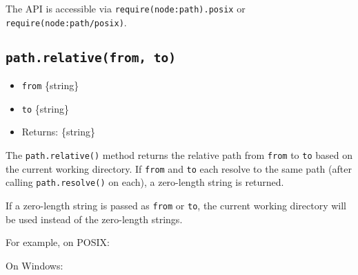 The API is accessible via
\texttt{require(\textquotesingle{}node:path\textquotesingle{}).posix} or
\texttt{require(\textquotesingle{}node:path/posix\textquotesingle{})}.

\subsection{\texorpdfstring{\texttt{path.relative(from,\ to)}}{path.relative(from, to)}}\label{path.relativefrom-to}

\begin{itemize}
\tightlist
\item
  \texttt{from} \{string\}
\item
  \texttt{to} \{string\}
\item
  Returns: \{string\}
\end{itemize}

The \texttt{path.relative()} method returns the relative path from
\texttt{from} to \texttt{to} based on the current working directory. If
\texttt{from} and \texttt{to} each resolve to the same path (after
calling \texttt{path.resolve()} on each), a zero-length string is
returned.

If a zero-length string is passed as \texttt{from} or \texttt{to}, the
current working directory will be used instead of the zero-length
strings.

For example, on POSIX:

\begin{Shaded}
\begin{Highlighting}[]
\NormalTok{(}\OperatorTok{,} \NormalTok{)}\OperatorTok{;}
\end{Highlighting}
\end{Shaded}

On Windows:

\begin{Shaded}
\begin{Highlighting}[]
\NormalTok{(}\SpecialCharTok{\textbackslash{}\textbackslash{}}\SpecialCharTok{\textbackslash{}\textbackslash{}}\SpecialCharTok{\textbackslash{}\textbackslash{}}\OperatorTok{,} \SpecialCharTok{\textbackslash{}\textbackslash{}}\SpecialCharTok{\textbackslash{}\textbackslash{}}\SpecialCharTok{\textbackslash{}\textbackslash{}}\NormalTok{)}\OperatorTok{;}
\end{Highlighting}
\end{Shaded}


